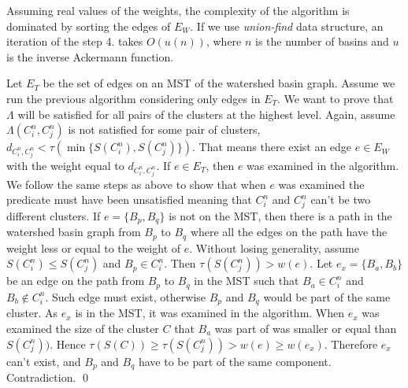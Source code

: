 \documentclass{llncs}
\begin{document}
Assuming real values of the weights, the complexity of the algorithm is dominated by sorting the edges of $E_W$. If we use \emph{union-find} data structure, an iteration of the step 4. takes $O(u(n))$, where $n$ is the number of basins and $u$ is the inverse Ackermann function.

Let $E_T$ be the set of edges on an MST of the watershed basin graph. Assume we run the previous algorithm considering only edges in $E_T$. We want to prove that $\Lambda$ will be satisfied for all pairs of the clusters at the highest level. Again, assume $\Lambda(C^n_i,C^n_j)$ is not satisfied for some pair of clusters, $d_{C^n_i,C^n_j} < \tau(\min\{S(C^n_i),S(C^n_j)\})$. That means there exist an edge $e \in E_W$ with the weight equal to $d_{C^n_i,C^n_j}$. If $e \in E_T$, then $e$ was examined in the algorithm. We follow the same steps as above to show that when $e$ was examined the predicate must have been unsatisfied meaning that $C^n_i$ and $C^n_j$ can't be two different clusters. If $e = \{B_p,B_q\}$ is not on the MST, then there is a path in the watershed basin graph from $B_p$ to $B_q$ where all the edges on the path have the weight less or equal to the weight of $e$. Without losing generality, assume $S(C^n_i) \le S(C^n_j)$ and $B_p \in C^n_i$. Then $\tau(S(C^n_j)) > w(e)$. Let $e_x=\{B_a,B_b\}$ be an edge on the path from $B_p$ to $B_q$ in the MST such that $B_a \in C^n_i$ and $B_b \notin C^n_i$. Such edge must exist, otherwise $B_p$ and $B_q$ would be part of the same cluster. As $e_x$ is in the MST, it was examined in the algorithm. When $e_x$ was examined the size of the cluster $C$ that $B_a$ was part of was smaller or equal than $S(C^n_j))$. Hence $\tau(S(C)) \ge \tau(S(C^n_j)) > w(e) \ge w(e_x)$. Therefore $e_x$ can't exist, and $B_p$ and $B_q$ have to be part of the same component. Contradiction. \qed
\end{document}
